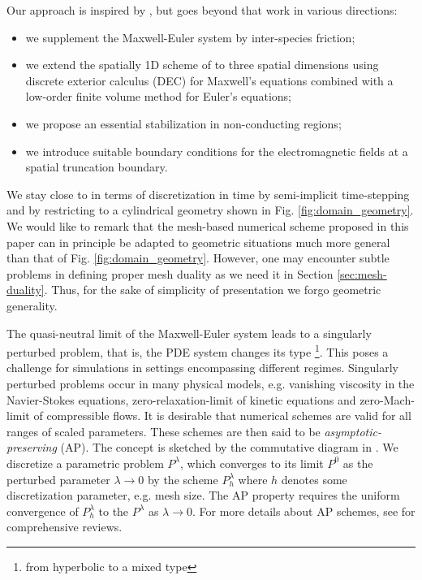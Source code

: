 \documentclass{article}
\begin{document}
Our approach is inspired by \cite{degond_2012}, but goes beyond that work in various directions:
\begin{itemize}
    \item we supplement the Maxwell-Euler system by inter-species friction;
    \item we extend the spatially 1D scheme of \cite{degond_2012} to three spatial dimensions using discrete exterior calculus (DEC) for Maxwell's equations combined with a low-order finite volume method for Euler's equations;
    \item we propose an essential stabilization in non-conducting regions;
    \item we introduce suitable boundary conditions for the electromagnetic fields at a spatial truncation boundary.
\end{itemize}

We stay close to \cite{degond_2012} in terms of discretization in time by semi-implicit time-stepping and by restricting to a cylindrical geometry shown in Fig. \ref{fig:domain_geometry}. We would like to remark that the mesh-based numerical scheme proposed in this paper can in principle be adapted to geometric situations much more general than that of Fig. \ref{fig:domain_geometry}. However, one may encounter subtle problems in defining proper mesh duality as we need it in Section \ref{sec:mesh-duality}. Thus, for the sake of simplicity of presentation we forgo geometric generality.

The quasi-neutral limit of the Maxwell-Euler system leads to a singularly perturbed problem, that is, the PDE system changes its type \footnote{from hyperbolic to a mixed type}. This poses a challenge for simulations in settings encompassing different regimes. Singularly perturbed problems occur in many physical models, e.g. vanishing viscosity in the Navier-Stokes equations\cite{Kato_1984}, zero-relaxation-limit of kinetic equations\cite{jin_2010} and zero-Mach-limit of compressible flows\cite{degond_2007, haack_2010}. It is desirable that numerical schemes are valid for all ranges of scaled parameters. These schemes are then said to be \emph{asymptotic-preserving} (AP). The concept is sketched by the commutative diagram in \cite{jin_1999}. We discretize a parametric problem $P^\lambda$, which converges to its limit $P^0$ as the perturbed parameter $\lambda \rightarrow 0$ by the scheme $P^\lambda_h$ where $h$ denotes some discretization parameter, e.g. mesh size. The AP property requires the uniform convergence of $P^\lambda_h$ to the $P^\lambda$ as $\lambda\rightarrow0$. For more details about AP schemes, see \cite{jin_2010, degond_2017} for comprehensive reviews.
\end{document}
